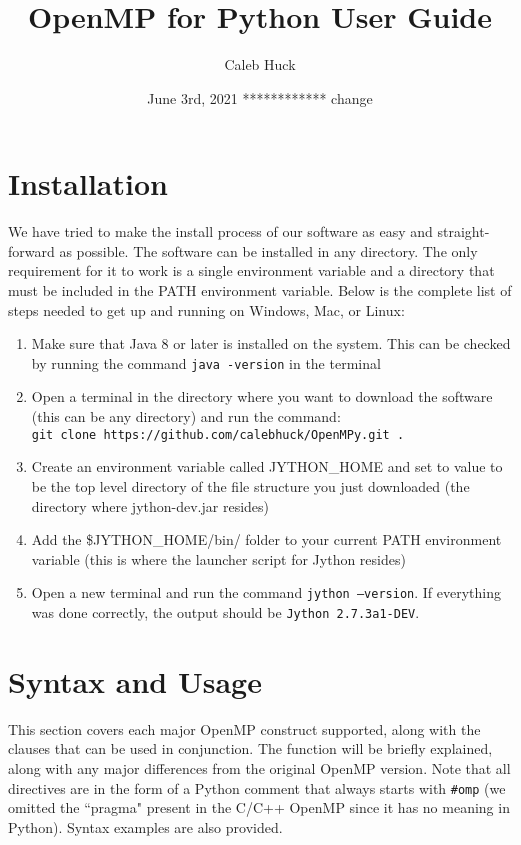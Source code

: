 \documentclass[letterpaper,12pt]{article} %
\begin{document}
\title{\Large{\textbf{OpenMP for Python User Guide}}}
\author{Caleb Huck}
\date{June 3rd, 2021 ************ change}
\maketitle

\section{Installation}
We have tried to make the install process of our software as easy and straight-forward as possible. The software can be installed in any directory. The only requirement for it to work is a single environment variable and a directory that must be included in the PATH environment variable. Below is the complete list of steps needed to get up and running on Windows, Mac, or Linux:
\begin{enumerate}
\item Make sure that Java 8 or later is installed on the system. This can be checked by running the command \texttt{java -version} in the terminal
\item Open a terminal in the directory where you want to download the software (this can be any directory) and run the command: \\ \texttt{git clone https://github.com/calebhuck/OpenMPy.git .}
\item Create an environment variable called JYTHON\_HOME and set to value to be the top level directory of the file structure you just downloaded (the directory where jython-dev.jar resides)
\item Add the \$JYTHON\_HOME/bin/ folder to your current PATH environment variable (this is where the launcher script for Jython resides)
\item Open a new terminal and run the command \texttt{jython --version}. If everything was done correctly, the output should be \texttt{Jython 2.7.3a1-DEV}. 
\end{enumerate}

\section{Syntax and Usage}
This section covers each major OpenMP construct supported, along with the clauses that can be used in conjunction. The function will be briefly explained, along with any major differences from the original OpenMP version. Note that all directives are in the form of a Python comment that always starts with \texttt{\#omp} (we omitted the ``pragma" present in the C/C++ OpenMP since it has no meaning in Python). Syntax examples are also provided.
\end{document}
